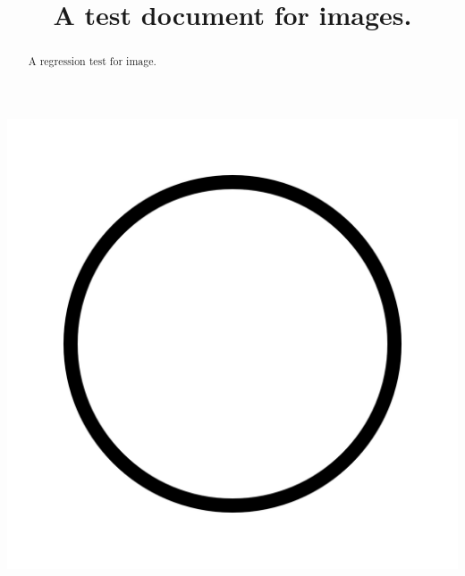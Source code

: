 \documentclass{ximera}
\title{A test document for images.}
\begin{document}
\begin{abstract}
  A regression test for image.
\end{abstract}
\maketitle


\begin{image}
\end{image}


\begin{image}
  \includegraphics{circle.png}
\end{image}
\end{document}
